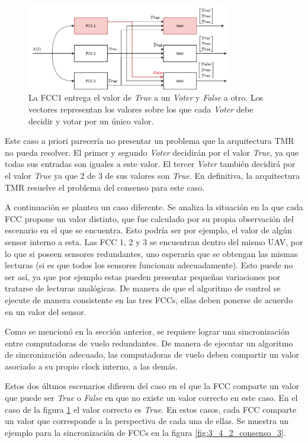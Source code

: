 \begin{figure}[H]
    \centering
    \includegraphics[width=0.8\textwidth]{img/3_4_2_consenso_2.png}
    \caption{La FCC1 entrega el valor de \textit{True} a un \textit{Voter} y \textit{False} a otro. Los vectores representan los valores sobre los que cada \textit{Voter} debe decidir y votar por un único valor.}
    \label{fig:3_4_2_consenso_2}
\end{figure}

Este caso a priori parecería no presentar un problema que la arquitectura TMR no pueda resolver. El primer y segundo \textit{Voter} decidirán por el valor \textit{True}, ya que todas sus entradas son iguales a este valor. El tercer \textit{Voter} también decidirá por el valor \textit{True} ya que 2 de 3 de sus valores son \textit{True}. En definitiva, la arquitectura TMR resuelve el problema del consenso para este caso.

A continuación se plantea un caso diferente. Se analiza la situación en la que cada FCC propone un valor distinto, que fue calculado por su propia observación del escenario en el que se encuentra. Esto podría ser por ejemplo, el valor de algún sensor interno a esta. Las FCC 1, 2 y 3 se encuentran dentro del mismo UAV, por lo que si poseen sensores redundantes, uno esperaría que se obtengan las mismas lecturas (si es que todos los sensores funcionan adecuadamente). Esto puede no ser así, ya que por ejemplo estas pueden presentar pequeñas variaciones por tratarse de lecturas analógicas. De manera de que el algoritmo de control se ejecute de manera consistente en las tres FCCs, ellas deben ponerse de acuerdo en un valor del sensor.

Como se mencionó en la sección anterior, se requiere lograr una sincronización entre computadoras de vuelo redundantes. De manera de ejecutar un algoritmo de sincronización adecuado, las computadoras de vuelo deben compartir un valor asociado a su propio clock interno, a las demás.

Estos dos últmos escenarios difieren del caso en el que la FCC comparte un valor que puede ser \textit{True} o \textit{False} en que no existe un valor correcto en este caso. En el caso de la figura \ref{fig:3_4_2_consenso_2} el valor correcto es \textit{True}. En estos casos, cada FCC comparte un valor que corresponde a la perspectiva de cada una de ellas. Se muestra un ejemplo para la sincronización de FCCs en la figura \ref{fig:3_4_2_consenso_3}.

